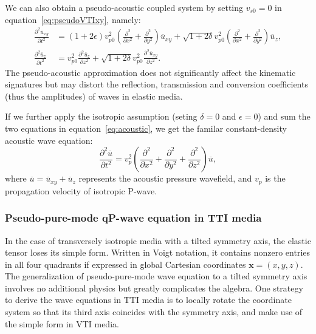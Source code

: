 We can also obtain a pseudo-acoustic coupled system by setting $v_{s0}=0$ in equation~\ref{eq:pseudoVTIxy}, namely:
\begin{equation}
\label{eq:acoustic}
\begin{split}
\frac{\partial^2\overline{u}_{xy}}{\partial t^2} & =
 (1+2\epsilon){v_{p0}^2}(\frac{\partial^2}{\partial x^2}+\frac{\partial^2}{\partial y^2}){\overline{u}_{xy}}
+ \sqrt{1+2\delta}{v_{p0}^2}(\frac{\partial^2}{\partial x^2}+\frac{\partial^2}{\partial y^2}){\overline{u}_z}, \\
\frac{\partial^2\overline{u}_{z}}{\partial t^2} & =
{v_{p0}^2}\frac{\partial^2{\overline{u}_z}}{\partial z^2}
+ \sqrt{1+2\delta}{v_{p0}^2}\frac{\partial^2\overline{u}_{xy}}{\partial z^2}.
\end{split}
\end{equation}
The pseudo-acoustic approximation does not significantly
 affect the kinematic signatures but may distort the reflection,
 transmission and conversion coefficients (thus the amplitudes) of waves in elastic media.

If we further apply the isotropic assumption (seting $\delta=0$ and $\epsilon=0$) and sum the two equations in
 equation~\ref{eq:acoustic}, we get the familar constant-density acoustic wave equation:
\begin{equation}
\frac{\partial^2\overline{u}}{\partial t^2} = 
{v_{p}^2}(\frac{\partial^2}{\partial x^2}+\frac{\partial^2}{\partial y^2}+\frac{\partial^2}{\partial z^2}){\overline{u}},
\end{equation}
where $\overline{u}=\overline{u}_{xy}+\overline{u}_{z}$ represents the acoustic pressure wavefield, and $v_{p}$ is
 the propagation velocity of isotropic P-wave.

\subsubsection{Pseudo-pure-mode qP-wave equation in TTI media}

In the case of transversely isotropic media with a tilted symmetry axis, the elastic tensor loses its simple
 form. Written in Voigt notation, it contains nonzero entries in all four quadrants if expressed in global
 Cartesian coordinates $\mathbf{x}=(x,y,z)$. The generalization of pseudo-pure-mode wave equation to a tilted symmetry
 axis involves no additional physics but greatly complicates the algebra. One strategy to derive the wave
 equations in TTI media is to locally rotate the coordinate system so that its third axis coincides with
 the symmetry axis, and make use of the simple form in VTI media.

